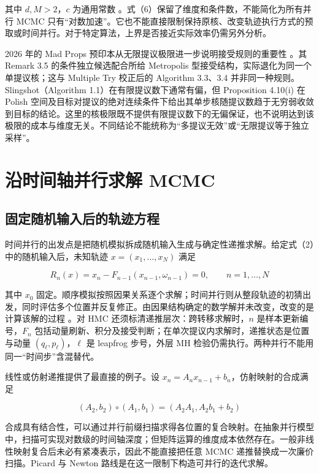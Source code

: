 \documentclass[UTF8,a4paper,zihao=-4,fontset=fandol]{ctexart}
\begin{document}
其中 $d,M>2$，$c$ 为通用常数 \cite{pozza2025}。式（6）保留了维度和条件数，不能简化为所有并行 MCMC 只有“对数加速”。它也不能直接限制保持原核、改变轨迹执行方式的预取或时间并行。对于特定算法，上界是否接近实际效率仍需另外分析。

2026 年的 Mad Props 预印本从无限提议极限进一步说明接受规则的重要性 \cite{glattholtz2026}。其 Remark 3.5 的条件独立候选配合所给 Metropolis 型接受结构，实际退化为同一个单提议核；这与 Multiple Try 校正后的 Algorithm 3.3、3.4 并非同一种规则。Slingshot（Algorithm 1.1）在有限提议数下通常有偏，但 Proposition 4.10(i) 在 Polish 空间及目标对提议的绝对连续条件下给出其单步核随提议数趋于无穷弱收敛到目标的结论。这里的核极限既不提供有限提议数下的无偏保证，也不说明达到该极限的成本与维度无关。不同结论不能统称为“多提议无效”或“无限提议等于独立采样”。

\section{沿时间轴并行求解 MCMC}

\subsection{固定随机输入后的轨迹方程}

时间并行的出发点是把随机模拟拆成随机输入生成与确定性递推求解。给定式（2）中的随机输入后，未知轨迹 $x=(x_1,\ldots,x_N)$ 满足

\begin{equation}
R_n(x)=x_n-F_{n-1}(x_{n-1},\omega_{n-1})=0,
\qquad n=1,\ldots,N
\label{eq:7}
\end{equation}

其中 $x_0$ 固定。顺序模拟按照因果关系逐个求解；时间并行则从整段轨迹的初猜出发，同时评估多个位置并反复修正。由因果结构确定的数学解并未改变，改变的是计算该解的过程 \cite{lim2024,zoltowski2025,grazzi2026}。对 HMC 还须标清递推层次：跨转移求解时，$n$ 是样本更新编号，$F_n$ 包括动量刷新、积分及接受判断；在单次提议内求解时，递推状态是位置与动量 $(q_\ell,p_\ell)$，$\ell$ 是 leapfrog 步号，外层 MH 检验仍需执行。两种并行不能用同一“时间步”含混替代。

线性或仿射递推提供了最直接的例子。设 $x_n=A_nx_{n-1}+b_n$，仿射映射的合成满足

\begin{equation}
(A_2,b_2)\circ(A_1,b_1)
=(A_2A_1,A_2b_1+b_2)
\label{eq:8}
\end{equation}

合成具有结合性，可以通过并行前缀扫描求得各位置的复合映射。在抽象并行模型中，扫描可实现对数级的时间轴深度；但矩阵运算的维度成本依然存在。一般非线性映射复合后未必有紧凑表示，因此不能直接把任意 MCMC 递推替换成一次廉价扫描。Picard 与 Newton 路线是在这一限制下构造可并行的迭代求解。
\end{document}
